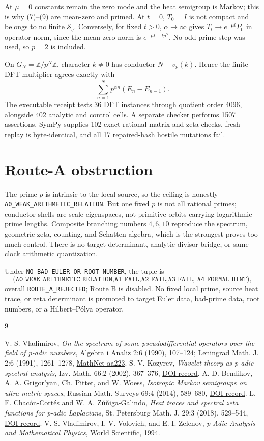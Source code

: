 \documentclass[10pt]{article}
\begin{document}
At $\mu=0$ constants remain the zero mode and the heat semigroup is Markov;
this is why (7)--(9) are mean-zero and primed.  At $t=0$, $T_0=I$ is not
compact and belongs to no finite $\mathcal S_q$.  Conversely, for fixed
$t>0$, $\alpha\to\infty$ gives $T_t\to e^{-\mu t}P_0$ in operator norm, since
the mean-zero norm is $e^{-\mu t-tp^\alpha}$.  No odd-prime step was used, so
$p=2$ is included.

On $G_N=\mathbb Z/p^N\mathbb Z$, character $k\ne0$ has conductor
$N-v_p(k)$.  Hence the finite DFT multiplier agrees exactly with
\[
 \sum_{n=1}^N p^{\alpha n}(E_n-E_{n-1}).                  \tag{10}
\]
The executable receipt tests 36 DFT instances through quotient order 4096,
alongside 402 analytic and control cells.  A separate checker performs 1507
assertions, SymPy supplies 102 exact rational-matrix and zeta checks, fresh
replay is byte-identical, and all 17 repaired-hash hostile mutations fail.

\section{Route-A obstruction}
The prime $p$ is intrinsic to the local source, so the ceiling is honestly
\texttt{A0\_WEAK\_ARITHMETIC\_RELATION}.  But one fixed $p$ is not all
rational primes; conductor shells are scale eigenspaces, not primitive orbits
carrying logarithmic prime lengths.  Composite branching numbers $4,6,10$
reproduce the spectrum, geometric zeta, counting, and Schatten algebra, which
is the strongest proves-too-much control.  There is no target determinant,
analytic divisor bridge, or same-clock arithmetic quantization.

Under \texttt{NO\_BAD\_EULER\_OR\_ROOT\_NUMBER}, the tuple is
\[
\texttt{(A0\_WEAK\_ARITHMETIC\_RELATION,A1\_FAIL,A2\_FAIL,A3\_FAIL,
A4\_FORMAL\_HINT)},
\]
overall \texttt{ROUTE\_A\_REJECTED}; Route B is disabled.  No fixed local
prime, source heat trace, or zeta determinant is promoted to target Euler
data, bad-prime data, root numbers, or a Hilbert--P\'olya operator.
\fi

\begin{thebibliography}{9}
\raggedright
{} V. S. Vladimirov,
\emph{On the spectrum of some pseudodifferential operators over the field of
p-adic numbers}, Algebra i Analiz 2:6 (1990), 107--124; Leningrad Math. J.
2:6 (1991), 1261--1278,
\href{https://www.mathnet.ru/eng/aa223}{MathNet aa223}.
 S. V. Kozyrev,
\emph{Wavelet theory as p-adic spectral analysis}, Izv. Math. 66:2 (2002),
367--376,
\href{https://doi.org/10.1070/IM2002v066n02ABEH000381}{DOI record}.
 A. D. Bendikov, A. A. Grigor'yan, Ch. Pittet, and W. Woess,
\emph{Isotropic Markov semigroups on ultra-metric spaces}, Russian Math.
Surveys 69:4 (2014), 589--680,
\href{https://doi.org/10.1070/RM2014v069n04ABEH004907}{DOI record}.
 L. F. Chac\'on-Cort\'es and W. A. Z\'u\~niga-Galindo,
\emph{Heat traces and spectral zeta functions for p-adic Laplacians},
St. Petersburg Math. J. 29:3 (2018), 529--544,
\href{https://doi.org/10.1090/spmj/1505}{DOI record}.
 V. S. Vladimirov, I. V. Volovich, and E. I. Zelenov,
\emph{p-Adic Analysis and Mathematical Physics}, World Scientific, 1994.
\end{thebibliography}
\end{document}
